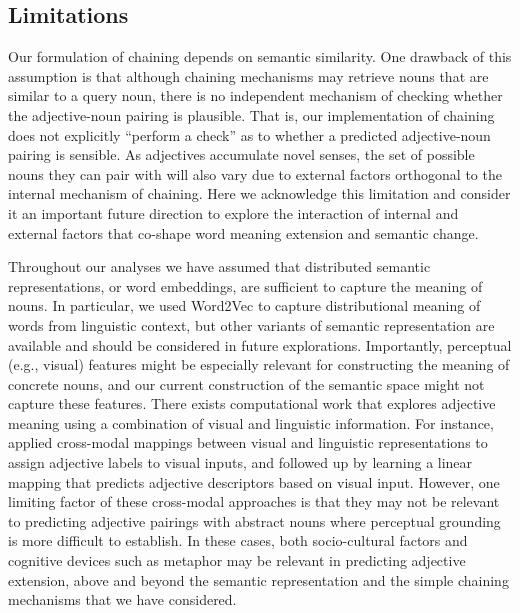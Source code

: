 \documentclass[output=paper]{langsci/langscibook}
\begin{document}
\subsection{Limitations}

Our formulation of chaining depends on semantic similarity. One drawback of this assumption is that although chaining mechanisms may retrieve nouns that are similar to a query noun, there is no independent mechanism of checking whether the adjective-noun pairing is plausible. That is, our implementation of chaining does not explicitly ``perform a check'' as to whether a predicted ad\-jec\-tive-noun pairing is sensible. As adjectives accumulate novel senses, the set of possible nouns they can pair with will also vary due to external factors orthogonal to the internal mechanism of chaining. Here we acknowledge this limitation and consider it an important future direction to explore the interaction of internal and external factors that co-shape word meaning extension and  semantic change.

Throughout our analyses we have assumed that distributed semantic representations, or word embeddings, are sufficient to capture the meaning of nouns. In particular, we used Word2Vec to capture distributional meaning of words from linguistic context, but other variants of semantic representation are available and should be considered in future explorations. Importantly, perceptual (e.g., visual) features might be especially relevant for constructing the meaning of concrete nouns, and our current construction of the semantic space might not capture these features.
There exists computational work that explores  adjective meaning using a combination of visual and linguistic information. For instance, \citet{lazaridou2015} applied cross-modal mappings between visual and linguistic representations to assign adjective labels to visual inputs, and \citet{nagarajan2018} followed up by learning a linear mapping that predicts adjective descriptors based on  visual input.
However, one limiting factor of these cross-modal approaches is that they may not be relevant to predicting adjective pairings with abstract nouns where perceptual grounding is more difficult to establish. In these cases, both socio-cultural factors and cognitive devices such as metaphor may be relevant in predicting adjective extension, above and beyond the semantic representation and the simple chaining mechanisms that we have considered. 
\end{document}
